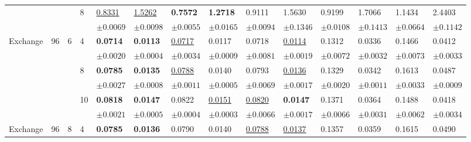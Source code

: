 {\begin{table}[tb]
{\begin{tabular}{p{10mm}p{2mm}p{2mm}p{4mm}p{10mm}p{10mm}p{10mm}p{10mm}p{10mm}p{10mm}p{10mm}p{10mm}p{10mm}p{10mm}}
& & &\multirow{2}{*}{8} &\underline{0.8331} &\underline{1.5262} &\textbf{0.7572} &\textbf{1.2718} &0.9111   &1.5630 &0.9199 &1.7066  &1.1434  &2.4403 \\

& & & &$\pm 0.0069 $&$\pm 0.0098 $&$\pm 0.0055$&$\pm 0.0165 $&$\pm 0.0094  $&$\pm 0.1346$&$\pm 0.0108 $&$	\pm 0.1413   $&$\pm 0.0664  $&$\pm 0.1142$\\

\midrule


\multirow{6}{*}{Exchange} 
&\multirow{6}{*}{96}  &\multirow{6}{*}{6} &\multirow{2}{*}{4} &\textbf{0.0714}   &\textbf{0.0113} &\underline{0.0717}&0.0117 &0.0718 
   &\underline{0.0114} &0.1312 &	0.0336  &0.1466   &0.0412 \\

& & & &$\pm 0.0020  $&$\pm 0.0004 $&$\pm 0.0034$&$\pm 0.0009 $&$\pm 0.0081  $&$\pm 0.0019$&$\pm 0.0072 $&$	\pm 0.0032   $&$\pm 0.0073  $&$\pm 0.0033$\\

& & &\multirow{2}{*}{8} & \textbf{0.0785}&\textbf{0.0135}&\underline{0.0788}&{0.0140}&0.0793 &\underline{0.0136}&0.1329 &	0.0342  &0.1613 &0.0487 
\\
& & & &$\pm 0.0027  $&$\pm 0.0008 $&$\pm 0.0011$&$\pm 0.0005 $&$\pm 0.0069  $&$\pm 0.0017$&$\pm 0.0020 $&$	\pm 0.0011   $&$\pm 0.0033  $&$\pm 0.0009$\\


& & &\multirow{2}{*}{10}& \textbf{0.0818}&\textbf{0.0147}&0.0822&\underline{0.0151}&\underline{0.0820}&\textbf{0.0147}&0.1371 &	0.0364 & 0.1488 &0.0418 
\\

& & & &$\pm 0.0021  $&$\pm 0.0005 $&$\pm 0.0004$&$\pm 0.0003 $&$\pm 0.0066  $&$\pm 0.0017$&$\pm 0.0066 $&$	\pm 0.0031   $&$\pm 0.0062  $&$\pm 0.0034$\\

\midrule
\multirow{6}{*}{Exchange} 
&\multirow{6}{*}{96}  &\multirow{6}{*}{8}&\multirow{2}{*}{4} &\textbf{0.0785}   &\textbf{0.0136} &0.0790 &0.0140 
 &\underline{0.0788} 
   &\underline{0.0137} &0.1357 &0.0359 &0.1615   &0.0490\\
   

\end{tabular}}
\end{table}}
